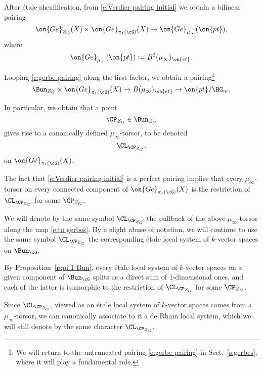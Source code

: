 \documentclass[9pt]{amsart}
\theoremstyle{remark}
\theoremstyle{definition}
\theoremstyle{remark}
\newcommand{\secref}[1]{Sect.~\ref{#1}}
\newcommand{\propref}[1]{Proposition~\ref{#1}}
\numberwithin{equation}{section}
\begin{document}
\sssec{}

After \'etale sheafification, from \eqref{e:Verdier pairing initial} we obtain a bilinear pairing
\begin{equation} \label{e:gerbe pairing}
\on{Ge}_{Z_G}(X)\times \on{Ge}_{\pi_1(\cG)}(X)\to \on{Ge}_{\mu_\infty}(\on{pt}),
\end{equation}
where
$$\on{Ge}_{\mu_\infty}(\on{pt}):=B^2(\mu_\infty)_{\on{et}}.$$

\sssec{} \label{sss:loop gerbes}

Looping \eqref{e:gerbe pairing} along the first factor, we obtain a pairing\footnote{We will return to the untruncated pairing \eqref{e:gerbe pairing}
in \secref{s:gerbes}, where it will play a fundamental role.}
\begin{equation} \label{e:truncated pairing}
\Bun_{Z_G} \times \on{Ge}_{\pi_1(\cG)}(X) \to B(\mu_\infty)_{\on{et}}\to \on{pt}/\BG_m. 
\end{equation}

In particular, we obtain that a point 
$$\CP_{Z_G}\in \Bun_{Z_G}$$
gives rise to a canonically defined $\mu_\infty$-torsor, to be denoted
$$\CL_{\CP_{Z_G}},$$  
on $\on{Ge}_{\pi_1(\cG)}(X)$.

\medskip

The fact that \eqref{e:Verdier pairing initial} is a perfect pairing implies that every $\mu_\infty$-torsor 
on every connected component of $\on{Ge}_{\pi_1(\cG)}(X)$ is the restriction of $\CL_{\CP_{Z_G}}$
for some $\CP_{Z_G}$. 

\sssec{}  

We will denote by the same symbol $\CL_{\CP_{Z_G}}$ the pullback of the above $\mu_\infty$-torsor along the map \eqref{e:to gerbes}.
By a slight abuse of notation, we will continue to use the same symbol $\CL_{\CP_{Z_G}}$ the corresponding \'etale local
system of $k$-vector spaces on $\Bun_\cG$.

\medskip

By \propref{p:pi 1 Bun}, every \'etale local system of $k$-vector spaces on a given component of $\Bun_\cG$
splits as a direct sum of 1-dimensional ones, and each of the latter is isomorphic to the restriction of 
$\CL_{\CP_{Z_G}}$ for some $\CP_{Z_G}$. 

\sssec{} \label{sss:L P Z G}

Since $\CL_{\CP_{Z_G}}$, viewed as an \'etale local system of $k$-vector spaces comes from a $\mu_\infty$-torsor, 
we can canonically associate to it a de Rham local system, which we will still denote by the
same character $\CL_{\CP_{Z_G}}$. 
\end{document}
